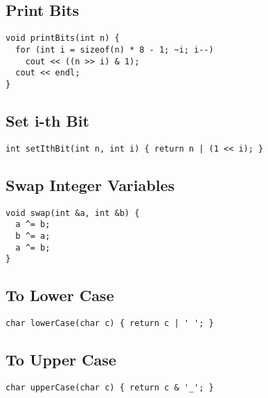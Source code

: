 \documentclass[twoside]{article}
\begin{document}
\begin{multicols*}{2}
\subsectionfont{\large\bfseries\sffamily\underline}
\subsection*{Print Bits}
\begin{verbatim}
void printBits(int n) {
  for (int i = sizeof(n) * 8 - 1; ~i; i--)
    cout << ((n >> i) & 1);
  cout << endl;
}
\end{verbatim}

\subsectionfont{\large\bfseries\sffamily\underline}
\subsection*{Set i-th Bit}
\begin{verbatim}
int setIthBit(int n, int i) { return n | (1 << i); }
\end{verbatim}

\subsectionfont{\large\bfseries\sffamily\underline}
\subsection*{Swap Integer Variables}
\begin{verbatim}
void swap(int &a, int &b) {
  a ^= b;
  b ^= a;
  a ^= b;
}
\end{verbatim}

\subsectionfont{\large\bfseries\sffamily\underline}
\subsection*{To Lower Case}
\begin{verbatim}
char lowerCase(char c) { return c | ' '; }
\end{verbatim}

\subsectionfont{\large\bfseries\sffamily\underline}
\subsection*{To Upper Case}
\begin{verbatim}
char upperCase(char c) { return c & '_'; }
\end{verbatim}


\end{multicols*}
\end{document}
